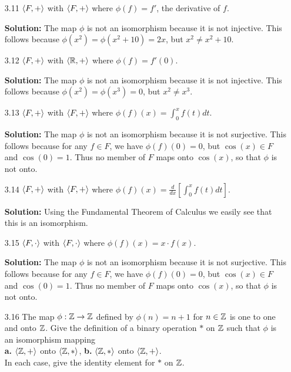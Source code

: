 \begin{enumerate}
   \item[3.11] $\langle F, + \rangle$ with $\langle F, + \rangle$ where $\phi(f) = f'$, the
               derivative of $f$.

      \textbf{Solution:} The map $\phi$ is not an isomorphism because it is not
      injective. This follows because $\phi(x^2) = \phi(x^2 + 10) = 2x$, but
      $x^2 \neq x^2 + 10$.
   \item[3.12] $\langle F, + \rangle$ with $\langle \mathbb{R}, + \rangle$ where $\phi(f) = f'(0)$.

      \textbf{Solution:} The map $\phi$ is not an isomorphism because it is not
      injective. This follows because $\phi(x^2) = \phi(x^3) = 0$, but
      $x^2 \neq x^3$.
   \item[3.13] $\langle F, + \rangle$ with $\langle F, + \rangle$ where
               $\phi(f)(x) = \int_0^xf(t)dt$.

      \textbf{Solution:} The map $\phi$ is not an isomorphism because it is not
      surjective. This follows because for any $f \in F$, we have
      $\phi(f)(0) = 0$, but $\cos(x) \in F$ and $\cos(0) = 1$. Thus no member
      of $F$ maps onto $\cos(x)$, so that $\phi$ is not onto.
   \item[3.14] $\langle F, + \rangle$ with $\langle F, + \rangle$ where
               $\phi(f)(x) = \frac{d}{dx}[\int_0^xf(t)dt]$.

      \textbf{Solution:} Using the Fundamental Theorem of Calculus we easily see
      that this is an isomorphism.
   \item[3.15] $\langle F, \cdot \rangle$ with $\langle F, \cdot \rangle$ where
               $\phi(f)(x) = x \cdot f(x)$.

      \textbf{Solution:} The map $\phi$ is not an isomorphism because it is not
      surjective. This follows because for any $f \in F$, we have
      $\phi(f)(0) = 0$, but $\cos(x) \in F$ and $\cos(0) = 1$. Thus no member
      of $F$ maps onto $\cos(x)$, so that $\phi$ is not onto.
   \item[3.16] The map $\phi : \mathbb{Z} \rightarrow \mathbb{Z}$ defined by $\phi(n) = n + 1$
               for $n \in \mathbb{Z}$ is one to one and onto $\mathbb{Z}$. Give the definition
               of a binary operation $*$ on $\mathbb{Z}$ such that $\phi$ is an
               isomorphism mapping \\
               \textbf{a.} $\langle \mathbb{Z}, + \rangle$ onto $\langle \mathbb{Z}, * \rangle$,
               \qquad\qquad\qquad\qquad\qquad\qquad\qquad\qquad
               \textbf{b.} $\langle \mathbb{Z}, * \rangle$ onto $\langle \mathbb{Z}, + \rangle$. \\
               In each case, give the identity element for $*$ on $\mathbb{Z}$.


\end{enumerate}
